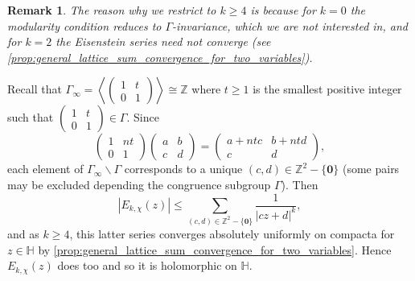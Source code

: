 \documentclass[12pt]{book}
\newtheorem{remark}{Remark}[section]
\theoremstyle{definition}\newframedtheorem{method}{Method}
\newcommand{\Z}{\mathbb{Z}}
\renewcommand{\H}{\mathbb{H}}
\newcommand{\G}{\Gamma}
\newcommand{\<}{\langle}
\renewcommand{\>}{\rangle}
\newcommand{\GG}{\G_{\infty}\backslash\G}
\begin{document}
      \begin{remark}
        The reason why we restrict to $k \ge 4$ is because for $k = 0$ the modularity condition reduces to $\G$-invariance, which we are not interested in, and for $k = 2$ the Eisenstein series need not converge (see \cref{prop:general_lattice_sum_convergence_for_two_variables}).
      \end{remark}

      Recall that $\G_{\infty} = \left\<\begin{pmatrix} 1 & t \\ 0 & 1 \end{pmatrix}\right\> \cong \Z$ where $t \ge 1$ is the smallest positive integer such that $\begin{pmatrix} 1 & t \\ 0 & 1 \end{pmatrix} \in \G$. Since
      \[
        \begin{pmatrix} 1 & nt \\ 0 & 1 \end{pmatrix}\begin{pmatrix} a & b \\ c & d \end{pmatrix} = \begin{pmatrix} a+ntc & b+ntd \\ c & d \end{pmatrix},
      \]
      each element of $\GG$ corresponds to a unique $(c,d) \in \Z^{2}-\{\mathbf{0}\}$ (some pairs may be excluded depending the congruence subgroup $\G$). Then
      \[
        |E_{k,\chi}(z)| \le \sum_{(c,d) \in \Z^{2}-\{\mathbf{0}\}}\frac{1}{|cz+d|^{k}},
      \]
      and as $k \ge 4$, this latter series converges absolutely uniformly on compacta for $z \in \H$ by \cref{prop:general_lattice_sum_convergence_for_two_variables}. Hence $E_{k,\chi}(z)$ does too and so it is holomorphic on $\H$.
\end{document}
